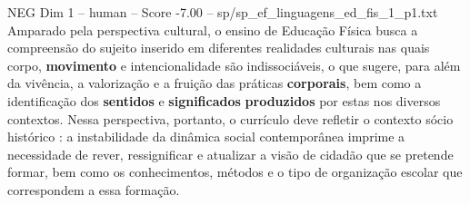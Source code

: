\begin{textsample}{NEG Dim 1 – human – Score -7.00 – sp/sp\_ef\_linguagens\_ed\_fis\_1\_p1.txt}  \label{ex:f1_neg_006}
Amparado pela perspectiva cultural, o ensino de Educação Física busca a compreensão do sujeito inserido em diferentes realidades culturais nas quais corpo, \textbf{movimento} e intencionalidade são indissociáveis, o que sugere, para além da vivência, a valorização e a fruição das práticas \textbf{corporais}, bem como a identificação dos \textbf{sentidos} e \textbf{significados} \textbf{produzidos} por estas nos diversos contextos.
Nessa perspectiva, portanto, o currículo deve refletir o contexto sócio histórico : a instabilidade da dinâmica social contemporânea imprime a necessidade de rever, ressignificar e atualizar a visão de cidadão que se pretende formar, bem como os conhecimentos, métodos e o tipo de organização escolar que correspondem a essa formação.

\end{textsample}
